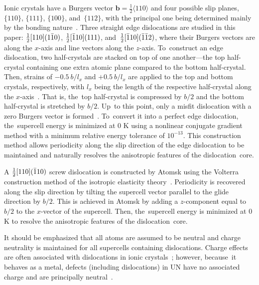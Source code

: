 \documentclass[applsci,article,accept,pdftex,moreauthors]{Definitions/mdpi}
\newcommand{\?}{\stackrel{?}{=}}
\begin{document}
Ionic crystals have a Burgers vector $\mathbf{b} = \frac{1}{2} \langle 110 \rangle$ and four possible slip planes, $\{ 110 \}$, $\{ 111 \}$, $\{ 100 \}$, and~$\{ 112 \}$, with the principal one being determined mainly by the bonding nature~\cite{Hull2011, Yadav2014}. Three straight edge dislocations are studied in this paper: $\frac{1}{2} [ 110 ] ( 1 \Bar{1} 0 )$, $\frac{1}{2} [ \Bar{1} 1 0 ] ( 111 )$, and~$\frac{1}{2} [ \Bar{1} 10 ] ( \Bar{1} \Bar{1} 2 )$, where their Burgers vectors are along the $x$-axis and line vectors along the $z$-axis. To~construct an edge dislocation, two half-crystals are stacked on top of one another---the top half-crystal containing one extra atomic plane compared to the bottom half-crystal. Then, strains of $-0.5~b/l_x$ and $+0.5~b/l_x$ are applied to the top and bottom crystals, respectively, with $l_x$ being the length of the respective half-crystal along the $x$-axis~\cite{Osetsky2003}. That is, the~top half-crystal is compressed by $b/2$ and the bottom half-crystal is stretched by $b/2$. Up~to this point, only a misfit dislocation with a zero Burgers vector is formed~\cite{Osetsky2003}. To~convert it into a perfect edge dislocation, the~supercell energy is minimized at 0 K using a nonlinear conjugate gradient method with a minimum relative energy tolerance of $10^{-13}$. This construction method allows  periodicity along the slip direction of the edge dislocation to be maintained and naturally resolves the anisotropic features of the dislocation~core.

A $\frac{1}{2} [ 110 ] ( \Bar{1} 1 0 )$ screw dislocation is constructed by Atomsk using the Volterra construction method of the isotropic elasticity theory~\cite{Hull2011}. Periodicity is recovered along the slip direction by tilting the supercell vector parallel to the glide direction by $b/2$. This is achieved in Atomsk by adding a $z$-component equal to $b/2$ to the $x$-vector of the supercell. Then, the~supercell energy is minimized at 0 K to resolve the anisotropic features of the dislocation~core.

It should be emphasized that all atoms are assumed to be neutral and charge neutrality is maintained for all supercells containing dislocations. Charge effects are often associated with dislocations in ionic crystals~\cite{Smoluchowski1966}; however, because~it behaves as a metal, defects (including dislocations) in UN have no associated charge and are principally neutral~\cite{Cooper2023}.

\end{document}
